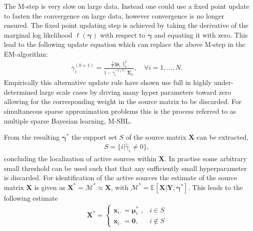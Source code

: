 The M-step is very slow on large data. 
Instead one could use a fixed point update to fasten the convergence on large data, however convergence is no longer ensured. 
The fixed point updating step is achieved by taking the derivative of the marginal log likelihood $\ell(\boldsymbol{\gamma})$ with respect to $\boldsymbol{\gamma}$ and equating it with zero. 
This lead to the following update equation which can replace the above M-step in the EM-algorithm:
\begin{align*}
\gamma_i^{(k+1)} = \frac{\frac{1}{L} \Vert \boldsymbol{\mu}_{i \cdot} \Vert_2^2}{1 - \gamma_i^{-1 (k)} \boldsymbol{\Sigma}_{ii}}, \quad \forall i = 1, \dots, N.
\end{align*}
Empirically this alternative update rule have shown use full in highly under-determined large scale cases by driving many hyper parameters toward zero allowing for the corresponding weight in the source matrix to be discarded. 
For simultaneous sparse approximation problems this is the process referred to as multiple sparse Bayesian learning, M-SBL.

From the resulting $\boldsymbol{\gamma}^\ast$ the support set $S$ of the source matrix $\mathbf{X}$ can be extracted, 
\begin{align*}
S = \{ i \vert \hat{\gamma}_i \neq 0 \},
\end{align*}
concluding the localization of active sources within $\mathbf{X}$. 
In practise some arbitrary small threshold can be used such that that any sufficiently small hyperparameter is discarded.
For identification of the active sources the estimate of the source matrix $\mathbf{X}$ is given as $\mathbf{X}^\ast = \mathcal{M}^\ast \approx \mathbf{X}$, with $\mathcal{M}^\ast = \mathbb{E}[\mathbf{X}\vert \mathbf{Y} ; \boldsymbol{\gamma}^\ast]$. 
This leads to the following estimate  
\begin{align*}
\mathbf{X}^\ast = 
\begin{cases}
\mathbf{x}_{i\cdot} = \boldsymbol{\mu}_{i \cdot}^\ast, & i \in S \\
\mathbf{x}_{i\cdot} = \mathbf{0}, & i \not \in S
\end{cases}
\end{align*}

